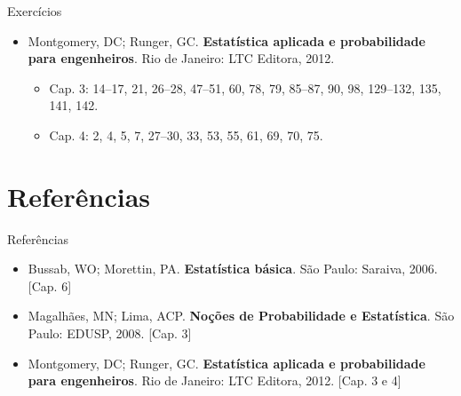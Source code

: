 \documentclass[10pt]{beamer}\usepackage[]{graphicx}\usepackage[]{color}
\theoremstyle{definition}
\begin{document}
\begin{frame}[fragile]{Exercícios}
  \begin{itemize}
  \item Montgomery, DC; Runger, GC. \textbf{Estatística aplicada e
      probabilidade para engenheiros}. Rio de Janeiro: LTC Editora,
    2012.
    \begin{itemize}
    \item Cap. 3: 14--17, 21, 26--28, 47--51, 60, 78, 79, 85--87, 90,
      98, 129--132, 135, 141, 142.
    \item Cap. 4: 2, 4, 5, 7, 27--30, 33, 53, 55, 61, 69, 70, 75.
    \end{itemize}
  \end{itemize}
\end{frame}

\section{Referências}

\begin{frame}{Referências}
  \begin{itemize}
  \item Bussab, WO; Morettin, PA. \textbf{Estatística básica}. São
    Paulo: Saraiva, 2006. [Cap. 6]
  \item Magalhães, MN; Lima, ACP. \textbf{Noções de Probabilidade e
      Estatística}. São Paulo: EDUSP, 2008. [Cap. 3]
  \item Montgomery, DC; Runger, GC. \textbf{Estatística aplicada e
      probabilidade para engenheiros}. Rio de Janeiro: LTC Editora,
    2012. [Cap. 3 e 4]
  \end{itemize}
\end{frame}
\end{document}
